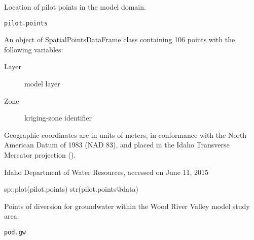 \documentclass[a4paper]{book}
\begin{document}
%
\begin{Description}\relax
Location of pilot points in the model domain.
\end{Description}
%
\begin{Usage}
\begin{verbatim}
pilot.points
\end{verbatim}
\end{Usage}
%
\begin{Format}
An object of SpatialPointsDataFrame class containing 106 points
with the following variables:
\begin{description}

\item[Layer] model layer
\item[Zone] kriging-zone identifier

\end{description}

Geographic coordinates are in units of meters, in conformance with the
North American Datum of 1983 (NAD 83), and placed in the
Idaho Transverse Mercator projection ().
\end{Format}
%
\begin{Source}\relax
Idaho Department of Water Resources, accessed on June 11, 2015
\end{Source}
%
\begin{SeeAlso}\relax
{}
\end{SeeAlso}
%
\begin{Examples}
\begin{ExampleCode}
sp::plot(pilot.points)
str(pilot.points@data)

\end{ExampleCode}
\end{Examples}
%
\begin{Description}\relax
Points of diversion for groundwater within the Wood River Valley model study area.
\end{Description}
%
\begin{Usage}
\begin{verbatim}
pod.gw
\end{verbatim}
\end{Usage}
%
\end{document}

